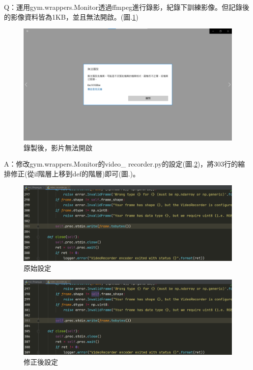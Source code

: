 \documentclass[14pt,a4paper]{report}  %
\begin{document}
\hspace{-1.7em} Q：運用gym.wrappers.Monitor透過ffmpeg進行錄影，紀錄下訓練影像。但記錄後的影像資料皆為1KB，並且無法開啟。(圖.\ref{fig.ffmpeg_mp4})\\
\begin{figure}[hbt!]
\begin{center}
\includegraphics[width=15cm]{ffmpeg_mp4}
\caption{\Large 錄製後，影片無法開啟}
\label{fig.ffmpeg_mp4}
\end{center}
\end{figure}
\hspace{-1.7em} A：修改gym.wrappers.Monitor的video\_ recorder.py的設定(圖.\ref{fig.video_recorder})，將303行的縮排修正(從if階層上移到def的階層)即可(圖.)。\\
\begin{figure}[hbt!]
\begin{center}
\includegraphics[width=15cm]{video_recorder}
\caption{\Large 原始設定}
\label{fig.video_recorder}
\end{center}
\end{figure}

\begin{figure}[hbt!]
\begin{center}
\includegraphics[width=15cm]{修正video_recorder}
\caption{\Large 修正後設定}
\label{fig.修正video_recorder}
\end{center}
\end{figure}
\end{document}
